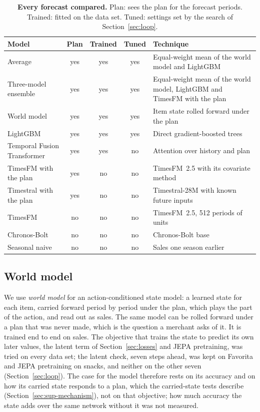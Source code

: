 \begin{table}[t]
\centering
\caption{\textbf{Every forecast compared.} Plan: sees the plan for the
forecast periods. Trained: fitted on the data set. Tuned: settings set by the
search of Section~\ref{sec:loop}.}
\label{tab:models}
\footnotesize
\renewcommand{\arraystretch}{1.15}
\setlength{\tabcolsep}{3pt}
\begin{tabular}{p{}cccp{}}
\toprule
\textbf{Model} & \textbf{Plan} & \textbf{Trained} & \textbf{Tuned} & \textbf{Technique} \\
\midrule
Average & yes & yes & yes & Equal-weight mean of the world model and LightGBM \\
Three-model ensemble & yes & yes & yes & Equal-weight mean of the world model, LightGBM and TimesFM with the plan \\
World model & yes & yes & yes & Item state rolled forward under the plan \\
LightGBM & yes & yes & yes & Direct gradient-boosted trees \\
Temporal Fusion Transformer & yes & yes & no & Attention over history and plan \\
TimesFM with the plan & yes & no & no & TimesFM~2.5 with its covariate method \\
Timestral with the plan & yes & no & no & Timestral-28M with known future inputs \\
TimesFM & no & no & no & TimesFM~2.5, 512 periods of units \\
Chronos-Bolt & no & no & no & Chronos-Bolt base \\
Seasonal naive & no & no & no & Sales one season earlier \\
\bottomrule
\end{tabular}
\end{table}

\subsection{World model}

We use \emph{world model} for an action-conditioned state model: a learned
state for each item, carried forward period by period under the plan, which
plays the part of the action, and read out as sales. The same model can be
rolled forward under a plan that was never made, which is the question a
merchant asks of it. It is trained end to end on sales. The objective that
trains the state to predict its own later values, the latent term of
Section~\ref{sec:losses} and JEPA pretraining, was tried on every data set; the
latent check, seven steps ahead, was kept on Favorita and JEPA pretraining on snacks, and
neither on the other seven (Section~\ref{sec:loop}). The case
for the model therefore rests on its accuracy and on how its carried state
responds to a plan, which the carried-state tests describe
(Section~\ref{sec:sup-mechanism}), not on that objective; how much accuracy the
state adds over the same network without it was not measured.

